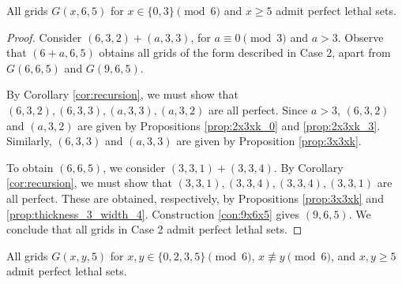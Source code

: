 \begin{lem}
\label{lem:thickness_5_case_2}
All grids $G(x,6,5)$ for $x \in \{0,3\} \pmod 6$ and $x \geq 5$ admit perfect lethal sets.
\end{lem}

\begin{proof}
Consider $(6,3,2) + (a,3,3)$, for $a \equiv 0 \pmod 3$ and $a >3$. Observe that $(6+a,6,5)$ obtains all grids of the form described in Case 2, apart from $G(6,6,5)$ and $G(9,6,5)$.

By Corollary \ref{cor:recursion}, we must show that $(6,3,2), (6,3,3), (a,3,3), (a,3,2)$ are all perfect. Since $a >3$, $(6,3,2)$ and $(a,3,2)$ are given by Propositions \ref{prop:2x3xk_0} and \ref{prop:2x3xk_3}. Similarly, $(6,3,3)$ and $(a,3,3)$ are given by Proposition \ref{prop:3x3xk}.

To obtain $(6,6,5)$, we consider $(3,3,1)+(3,3,4)$. By Corollary \ref{cor:recursion}, we must show that $(3,3,1), (3,3,4), (3,3,4), (3,3,1)$ are all perfect. These are obtained, respectively, by Propositions \ref{prop:3x3xk} and \ref{prop:thickness_3_width_4}. Construction \ref{con:9x6x5} gives $(9,6,5)$. We conclude that all grids in Case 2 admit perfect lethal sets.
\end{proof}

\begin{lem}
\label{lem:thickness_5_case_3}
All grids $G(x,y,5)$ for $x,y \in \{0,2,3,5\} \pmod 6$, $x \not\equiv y \pmod 6$, and $x,y \geq 5$ admit perfect lethal sets.
\end{lem}

